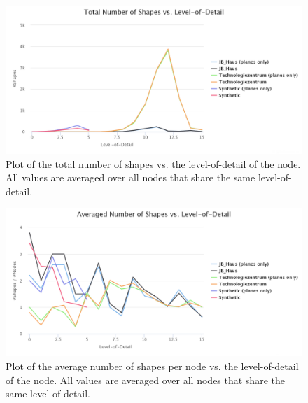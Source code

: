 \begin{figure}[h]
    \centering
    \includegraphics[width=1\textwidth]{Results/shapes_total_vs_lod.png}
    \caption[Plot of the total number of shapes vs. to the level-of-detail of the node]
		{Plot of the total number of shapes vs. the level-of-detail of the node. All values are averaged over all nodes that share the same level-of-detail.}
    \label{fig:shapes_total_vs_lod}
\end{figure}

\begin{figure}[h]
    \centering
    \includegraphics[width=1\textwidth]{Results/shapes_averaged_vs_lod.png}
    \caption[Plot of the average number of shapes per node vs. the level-of-detail of the node]
		{Plot of the average number of shapes per node vs. the level-of-detail of the node. All values are averaged over all nodes that share the same level-of-detail.}
    \label{fig:shapes_averaged_vs_lod}
\end{figure}

